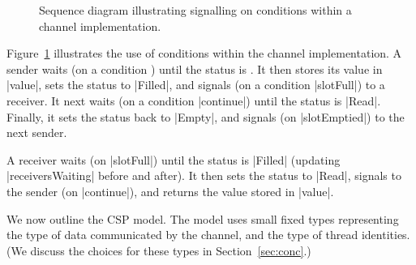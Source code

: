\begin{figure}
\begin{center}
\def\rx{3} %
\def\height{4}  %
\def\delta{0.8} %
\end{center}
\caption{Sequence diagram illustrating signalling on conditions within a channel
  implementation. \label{fig:channel-sd}} 
\end{figure}


Figure~\ref{fig:channel-sd} illustrates the use of conditions within the
channel implementation. 
A sender waits (on a condition ) until the status is
.  It then stores its value in |value|, sets the status to
|Filled|, and signals (on a condition |slotFull|) to a receiver.  It next 
waits (on a condition |continue|) until the status is |Read|.  Finally, it
sets the status back to |Empty|, and signals (on |slotEmptied|) to the next
sender.

A receiver waits (on |slotFull|) until the status is |Filled| (updating
|receiversWaiting| before and after).  It then sets the status to |Read|,
signals to the sender (on |continue|), and returns the value stored in
|value|.

We now outline the CSP model.  The model uses small fixed types representing
the type of data communicated by the channel, and the type of thread
identities.  (We discuss the choices for these types in
Section~\ref{sec:conc}.)  

